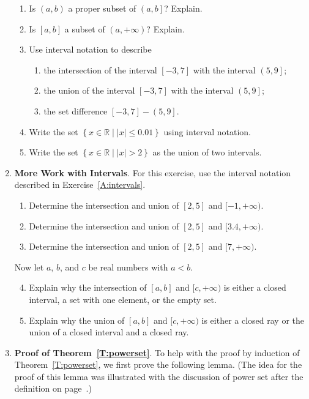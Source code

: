 \begin{enumerate}
\begin{enumerate}
\item Is  $\left( {a,b} \right)$ a proper subset of   $\left( {a,b} \right]$?  Explain.
\item Is  $\left[ {a,b} \right]$ a subset of   $\left( {a, + \infty } \right)$?  Explain.
\item Use interval notation to describe
\begin{enumerate}
\item the intersection of  the interval  $\left[ { - 3,7} \right]$ with the interval  $\left( {5,9} \right]$;
\item the union of  the interval  $\left[ { - 3,7} \right]$ with the interval  $\left( {5,9} \right]$;
\item the set difference $\left[ -3, 7 \right] - \left( 5, 9 \right]$.
\end{enumerate}
\item Write the set  $\left\{ {x \in \mathbb{R}} \mid \left| x \right| \leq 0.01 \right\}$ using interval notation.
\item Write the set  $\left\{ x \in \mathbb{R} \mid \left| x \right| > 2 \right\}$
as the union of two intervals.
\end{enumerate}

\item \textbf{More Work with Intervals}.  For this exercise, use the interval notation described in Exercise~\ref{A:intervals}.
\label{exer:intervals41}%
\begin{enumerate}
\item Determine the intersection and union of  $[2, 5]$ and  $[-1, +\infty)$.
\item Determine the intersection and union of  $[2, 5]$ and  $[3.4, +\infty)$.
\item Determine the intersection and union of  $[2, 5]$ and  $[7, +\infty)$.
\end{enumerate}
Now let $a$, $b$, and $c$ be real numbers with $a < b$.
\begin{enumerate} \setcounter{enumii}{3}
\item Explain why the intersection of $[a, b]$ and $[c, +\infty)$ is either a closed interval, a set with one element, or the empty set.
\item Explain why the union of $[a, b]$ and $[c, +\infty)$ is either a closed ray or the union of a closed interval and a closed ray.
\end{enumerate}


\item \textbf{Proof of Theorem~\ref{T:powerset}}.  \label{exer:powerset}  To help with the proof by induction of Theorem~\ref{T:powerset}, we first prove the following lemma. (The idea for the proof of this lemma was illustrated with the discussion of power set after the definition on page~\pageref{D:powerset}.)


\end{enumerate}
